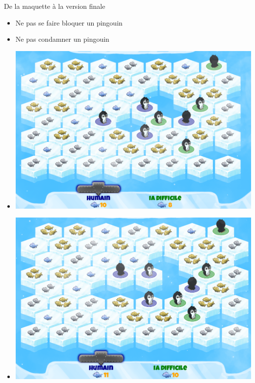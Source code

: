 \documentclass{beamer}
\begin{document}
\begin{frame}{De la maquette à la version finale}
\begin{frame}{}
\begin{block}{}
\begin{itemize}
 \item<1-> Ne pas se faire bloquer un pingouin
 \item<2-> Ne pas condamner un pingouin
 \item<3-> \includegraphics[scale=0.09]{IA7}
 \item<4-> \includegraphics[scale=0.09]{IA8}
\end{itemize}
\end{block}
\end{frame}


\end{frame}
\end{document}
